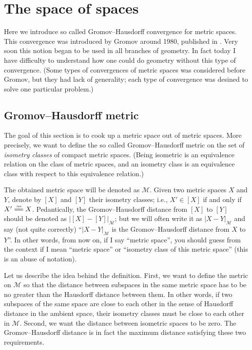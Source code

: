 \chapter{The space of spaces}\label{chap:gromov-hausdorff}

Here we introduce so called Gromov--Hausdorff convergence for metric spaces.
This convergence was introduced by Gromov around 1980, published in \cite{gromov-polynomial-growth}.
Very soon this notion began to be used in all branches of geometry.
In fact today I have difficulty to understand 
how one could do geometry without this type of convergence.%
(Some types of convergences of metric spaces was considered before Gromov,
but they had lack of generality;
each type of convergence was desined to solve one particular problem.)



\section{Gromov--Hausdorff metric}

The goal of this section is to cook up a metric space out of metric spaces.
More precisely, we want to define the so called  Gromov--Hausdorff metric on the set of \emph{isometry classes} of compact metric spaces.
(Being isometric is an equivalence relation on the class of metric spaces, 
and an isometry class is an equivalence class with respect to this equivalence relation.)

The obtained metric space will be denoted as $\mathcal{M}$.
Given two metric spaces $X$ and $Y$,
denote by $[X]$ and $[Y]$ their isometry classes;
i.e., $X'\in [X]$ if and only if $X'\iso X$.
Pedantically, the Gromov--Hausdorff distance from $[X]$ 
to $[Y]$ should be denoted as $|[X]-[Y]|_{\mathcal{M}}$;
but we will often write it as $|X-Y|_{\mathcal{M}}$ and say (not quite correctly) 
``$|X-Y|_{\mathcal{M}}$ is the Gromov--Hausdorff distance from  $X$ 
to  $Y$''.
In other words, from now on, if I say ``metric space'',
you should guess from the context if I mean ``metric space'' 
or ``isometry class of this metric space'' (this is an abuse of notation).

Let us describe the idea behind
the definition. 
First, we want to define the metric on $\mathcal{M}$ so that the distance between subspaces in
the same metric space has to be no greater than the Hausdorff distance between
them. 
In other words, if two subspaces of the same space are close to each
other in the sense of Hausdorff distance in the ambient space, their isometry classes must be
close to each other in $\mathcal{M}$. 
Second, we want
the distance between isometric spaces to be zero. 
The Gromov--Hausdorff
distance is in fact the maximum distance satisfying these two requirements.


